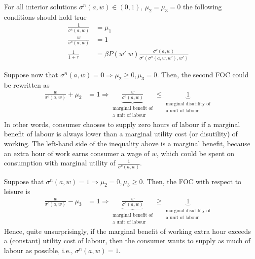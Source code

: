 \documentclass[]{article}
\begin{document}
For all interior solutions $\sigma^n(a, w)\in(0, 1)$, $\mu_2 = \mu_3 = 0$ the following conditions should hold true
\begin{equation}
	\begin{split}
		\frac{1}{\sigma^c(a, w)}& = \mu_1 \\
		\frac{w}{\sigma^c(a, w)}& = 1 \\
		\frac{1}{1 + r}& = \beta P(w'|w) \frac{\sigma^c(a, w)}{\sigma^c(\sigma^a(a, w, w'), w')}
		\label{eq:ex1intfoc}
	\end{split}
\end{equation}

Suppose now that $\sigma^n(a, w) = 0 \Longrightarrow \mu_2\geq 0, \mu_3 = 0$. Then, the second FOC could be rewritten as
\begin{equation}
	\begin{split}
		\frac{w}{\sigma^c(a, w)} + \mu_2& = 1 \Longrightarrow \underbrace{\frac{w}{\sigma^c(a, w)}}_{\substack{\text{marginal benefit of}\\\text{a unit of labour}}} \leq \underbrace{1}_{\substack{\text{marginal disutility of}\\\text{a unit of labour}}} \nonumber
	\end{split}
\end{equation}
In other words, consumer chooses to supply zero hours of labour if a marginal benefit of labour is always lower than a marginal utility cost (or disutility) of working. The left-hand side of the inequality above is a marginal benefit, because an extra hour of work earns consumer a wage of $w$, which could be spent on consumption with marginal utility of $\frac{1}{\sigma^c(a, w)}$. 

Suppose that $\sigma^n(a, w) = 1 \Longrightarrow \mu_2 = 0, \mu_3\geq 0$. Then, the FOC with respect to leisure is
\begin{equation}
	\begin{split}
		\frac{w}{\sigma^c(a, w)} - \mu_3& = 1 \Longrightarrow \underbrace{\frac{w}{\sigma^c(a, w)}}_{\substack{\text{marginal benefit of}\\\text{a unit of labour}}} \geq \underbrace{1}_{\substack{\text{marginal disutility of}\\\text{a unit of labour}}} \nonumber
	\end{split}
\end{equation}
Hence, quite unsurprisingly, if the marginal benefit of working extra hour exceeds a (constant) utility cost of labour, then the consumer wants to supply as much of labour as possible, i.e., $\sigma^n(a, w) = 1$.
\end{document}
